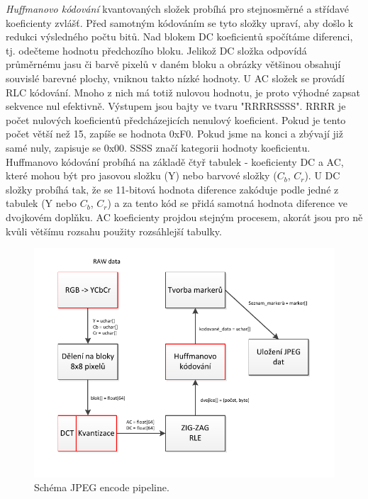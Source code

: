 \documentclass[a4paper,11pt]{article}
\begin{document}
\textit{Huffmanovo kódování} kvantovaných složek probíhá pro stejnosměrné a střídavé koeficienty zvlášť. Před samotným kódováním se tyto složky upraví, aby došlo k redukci výsledného počtu bitů. Nad blokem DC koeficientů spočítáme diferenci, tj. odečteme hodnotu předchozího bloku. Jelikož DC složka odpovídá průměrnému jasu či barvě pixelů v daném bloku a obrázky většinou obsahují souvislé barevné plochy, vniknou takto nízké hodnoty\cite{root}. U AC složek se provádí RLC kódování. Mnoho z nich má totiž nulovou hodnotu, je proto výhodné zapsat sekvence nul efektivně. Výstupem jsou bajty ve tvaru "RRRRSSSS". RRRR je počet nulových koeficientů předcházejicích nenulový koeficient. Pokud je tento počet větší než 15, zapíše se hodnota 0xF0. Pokud jsme na konci a zbývají již samé nuly, zapisuje se 0x00. SSSS značí kategorii hodnoty koeficientu.
Huffmanovo kódování probíhá na základě čtyř tabulek - koeficienty DC a AC, které mohou být pro jasovou složku (Y) nebo barvové složky ($C_b$, $C_r$). U DC složky probíhá tak, že se 11-bitová hodnota diference zakóduje podle jedné z tabulek (Y nebo $C_b$, $C_r$) a za tento kód se přidá samotná hodnota diference ve dvojkovém doplňku. AC koeficienty projdou stejným procesem, akorát jsou pro ně kvůli většímu rozsahu použity rozsáhlejší tabulky.

\begin{figure}[H]
  \centering
  \includegraphics[width=15cm]{pipeline.pdf}
  \caption{Schéma JPEG encode pipeline.}
  \label{pipeline}
\end{figure}
\end{document}
